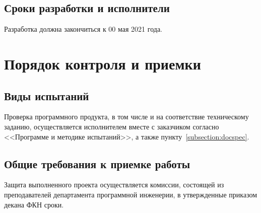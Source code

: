 \documentclass[techtask]{espd}
\begin{document}
\subsection{Сроки разработки и исполнители}
Разработка должна закончиться к 00 мая 2021 года.

\section{Порядок контроля и приемки}
\subsection{Виды испытаний}
Проверка программного продукта, в том числе и на соответствие техническому заданию, осуществляется исполнителем вместе с заказчиком согласно <<Программе и методике испытаний>>, а также пункту~\ref{subsection:docspec}.

\subsection{Общие требования к приемке работы}
Защита выполненного проекта осуществляется комиссии, состоящей из преподавателей департамента программной инженерии, в утвержденные приказом декана ФКН сроки.


\end{document}
